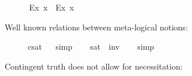 \begin{isabellebody}
%
\isadelimproof
\ %
\endisadelimproof
%
\isatagproof
{}\isamarkupfalse%
\ %
%
\endisatagproof
{\isafoldproof}%
%
\isadelimproof
%
\endisadelimproof
\isanewline
\ \isamarkupfalse%
\ {\isachardoublequoteopen}{\isasymlfloor}\isactrlbold {\isasymbox}{\isacharparenleft}\isactrlbold {\isasymforall}\isactrlsup Ex{\isachardot}{\isacharparenleft}{\isasymphi}\ x{\isacharparenright}{\isacharparenright}\ \isactrlbold {\isasymrightarrow}\ {\isacharparenleft}\isactrlbold {\isasymforall}\isactrlsup Ex{\isachardot}\isactrlbold {\isasymbox}{\isacharparenleft}{\isasymphi}\ x{\isacharparenright}{\isacharparenright}{\isasymrfloor}{\isachardoublequoteclose}\ \isamarkupfalse%
%
\isadelimproof
\ %
\endisadelimproof
%
\isatagproof
{}\isamarkupfalse%
\ %
%
\endisatagproof
{\isafoldproof}%
%
\isadelimproof
%
\endisadelimproof
%
\begin{isamarkuptext}%
Well known relations between meta-logical notions:%
\end{isamarkuptext}\isamarkuptrue%
\ \isamarkupfalse%
\ \ {\isachardoublequoteopen}{\isasymlfloor}{\isasymphi}{\isasymrfloor}\ {\isasymlongleftrightarrow}\ {\isasymnot}{\isasymlfloor}{\isasymphi}{\isasymrfloor}\isactrlsup c\isactrlsup s\isactrlsup a\isactrlsup t{\isachardoublequoteclose}%
\isadelimproof
\ %
\endisadelimproof
%
\isatagproof
{}\isamarkupfalse%
\ simp%
\endisatagproof
{\isafoldproof}%
%
\isadelimproof
%
\endisadelimproof
\isanewline
\ \isamarkupfalse%
\ \ {\isachardoublequoteopen}{\isasymlfloor}{\isasymphi}{\isasymrfloor}\isactrlsup s\isactrlsup a\isactrlsup t\ {\isasymlongleftrightarrow}\ {\isasymnot}{\isasymlfloor}{\isasymphi}{\isasymrfloor}\isactrlsup i\isactrlsup n\isactrlsup v\ {\isachardoublequoteclose}%
\isadelimproof
\ %
\endisadelimproof
%
\isatagproof
{}\isamarkupfalse%
\ simp%
\endisatagproof
{\isafoldproof}%
%
\isadelimproof
%
\endisadelimproof
%
\begin{isamarkuptext}%
Contingent truth does not allow for necessitation:%
\end{isamarkuptext}\isamarkuptrue%
\ \isamarkupfalse%
\ {\isachardoublequoteopen}{\isasymlfloor}\isactrlbold {\isasymdiamond}{\isasymphi}{\isasymrfloor}\ \ {\isasymlongrightarrow}\ {\isasymlfloor}\isactrlbold {\isasymbox}{\isasymphi}{\isasymrfloor}{\isachardoublequoteclose}\ \isamarkupfalse%
%
\isadelimproof
\ %
\endisadelimproof
%
\isatagproof
{}\isamarkupfalse%

\end{isabellebody}
